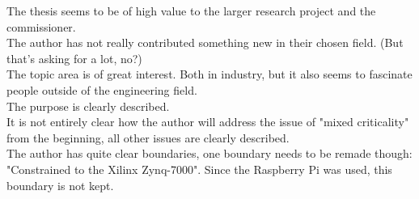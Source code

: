 \documentclass{article}
\begin{document}
The thesis seems to be of high value to the larger research project and the commissioner. \\


The author has not really contributed something new in their chosen field. (But that's asking for a lot, no?)\\%



The topic area is of great interest. Both in industry, but it also seems to fascinate people outside of the engineering field.\\





The purpose is clearly described.\\



It is not entirely clear how the author will address the issue of "mixed criticality" from the beginning, all other issues are clearly described.\\




The author has quite clear boundaries, one boundary needs to be remade though: "Constrained to the Xilinx Zynq-7000". Since the Raspberry Pi was used, this boundary is not kept.\\
\end{document}
